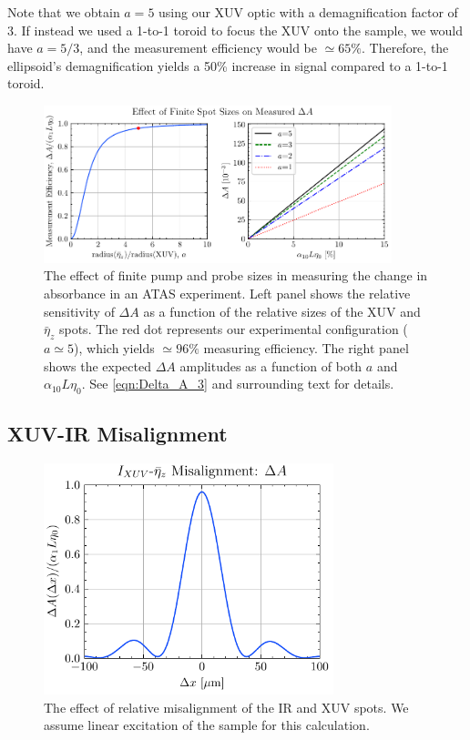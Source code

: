 Note that we obtain $a=5$ using our XUV optic with a demagnification factor of 3. If instead we used a 1-to-1 toroid to focus the XUV onto the sample, we would have $a=5/3$, and the measurement efficiency would be $\simeq 65\%$. Therefore, the ellipsoid's demagnification yields a 50\% increase in signal compared to a 1-to-1 toroid.

\begin{figure}
	\centering
	\includegraphics[width=0.9\textwidth]{figures/chap4/Delta_A_curves.pdf}
	\caption{The effect of finite pump and probe sizes in measuring the change in absorbance in an ATAS experiment. Left panel shows the relative sensitivity of $\Delta A$ as a function of the relative sizes of the XUV and $\bar{\eta}_z$ spots. The red dot represents our experimental configuration ($a\simeq 5$), which yields $\simeq 96\%$ measuring efficiency. The right panel shows the expected $\Delta A$ amplitudes as a function of both $a$ and $\alpha_{10} L \eta_0$. See \cref{eqn:Delta_A_3} and surrounding text for details.}
	\label{fig:Delta_A_curve}
\end{figure}


\subsection{XUV-IR Misalignment}

\begin{figure}
	\centering
	\includegraphics[width=0.75\textwidth]{figures/chap4/XUV_eta_misalignment.pdf}
	\caption{The effect of relative misalignment of the IR and XUV spots. We assume linear excitation of the sample for this calculation.}
	\label{fig:XUV_eta_misalignment}
\end{figure}

